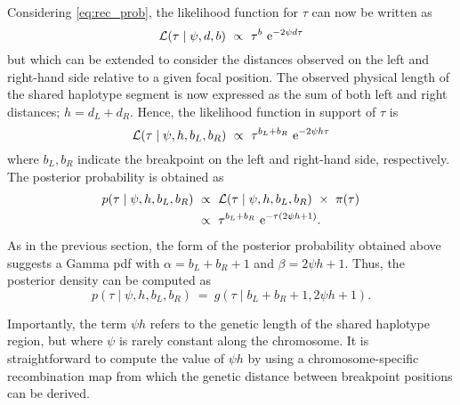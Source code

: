 Considering \cref{eq:rec_prob}, the likelihood function for $\tau$ can now be written as
\begin{equation}\label{eq:rec_like_x}
	\mathcal{L}(\tau \mid \psi,d,b)~\propto~\tau^b \,\,\mathrm{e}^{-2\psi d \tau}
\end{equation}
but which can be extended to consider the distances observed on the left and right-hand side relative to a given focal position.
The observed physical length of the shared haplotype segment is now expressed as the sum of both left and right distances; \ie ${h = d_L + d_R}$.
Hence, the likelihood function in support of $\tau$ is
\begin{equation}\label{eq:rec_like}
	\mathcal{L}(\tau \mid \psi,h,b_L,b_R)~\propto~\tau^{b_L + b_R} \,\,\mathrm{e}^{-2\psi h \tau}
\end{equation}
where ${b_L,b_R}$ indicate the breakpoint on the left and right-hand side, respectively.
The posterior probability is obtained as
\begin{equation}\label{eq:rec_post}
\begin{split}
	p(\tau \mid \psi,h,b_L,b_R)
	&~\propto~
	\mathcal{L}(\tau \mid \psi, h, b_L, b_R)~\times~\pi(\tau) \\
	&~\propto~
	\tau^{b_L + b_R} \,\,\mathrm{e}^{-\tau(2\psi h +1)}\text{.}
\end{split}
\end{equation}
As in the previous section, the form of the posterior probability obtained above suggests a Gamma \gls{pdf} with ${\alpha = b_L + b_R +1}$ and ${\beta = 2\psi h +1}$.
Thus, the posterior density can be computed as
\begin{equation}
	p(\tau \mid \psi,h,b_L,b_R)~=~g(\tau\mid b_L + b_R +1, 2\psi h +1)\text{.}
\end{equation}

Importantly, the term ${\psi h}$ refers to the genetic length of the shared haplotype region, but where $\psi$ is rarely constant along the chromosome.
It is straightforward to compute the value of ${\psi h}$ by using a chromosome-specific recombination map from which the genetic distance between breakpoint positions can be derived.


